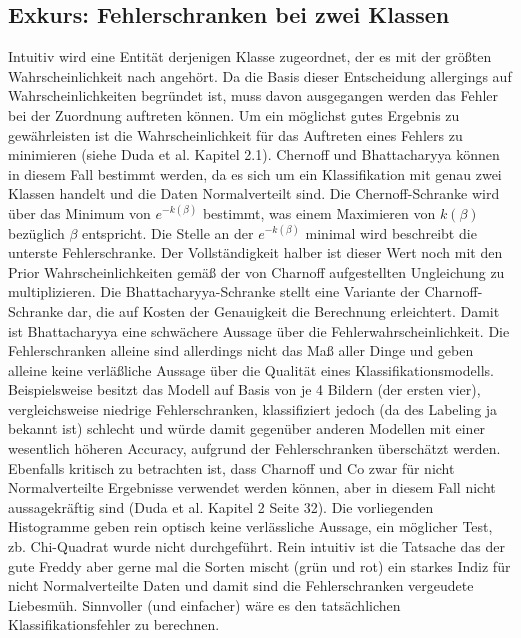 \documentclass[a4paper,10pt]{article}
\begin{document}
\subsection{Exkurs: Fehlerschranken bei zwei Klassen}
Intuitiv wird eine Entität derjenigen Klasse zugeordnet, der es mit der größten Wahrscheinlichkeit nach angehört. Da die Basis dieser Entscheidung allergings
auf Wahrscheinlichkeiten begründet ist, muss davon ausgegangen werden das Fehler bei der Zuordnung auftreten können. Um ein möglichst gutes Ergebnis zu gewährleisten
ist die Wahrscheinlichkeit für das Auftreten eines Fehlers zu minimieren (siehe Duda et al. Kapitel 2.1).
\newline
Chernoff und Bhattacharyya können in diesem Fall bestimmt werden, da es sich um ein Klassifikation mit genau zwei Klassen handelt und die Daten Normalverteilt sind.
Die Chernoff-Schranke wird über das Minimum von $e^{-k(\beta)}$ bestimmt, was einem Maximieren von $k(\beta)$ bezüglich $\beta$ entspricht. Die Stelle an
der $e^{-k(\beta)}$ minimal wird beschreibt die unterste Fehlerschranke. Der Vollständigkeit halber ist dieser Wert noch mit den Prior Wahrscheinlichkeiten
gemäß der von Charnoff aufgestellten Ungleichung zu multiplizieren.
\newline
Die Bhattacharyya-Schranke stellt eine Variante der Charnoff-Schranke dar, die auf Kosten der Genauigkeit die Berechnung erleichtert. Damit ist Bhattacharyya eine
schwächere Aussage über die Fehlerwahrscheinlichkeit.
\newline 
Die Fehlerschranken alleine sind allerdings nicht das Maß aller Dinge und geben alleine keine verläßliche Aussage über die Qualität eines Klassifikationsmodells.
Beispielsweise besitzt das Modell auf Basis von je 4 Bildern (der ersten vier), vergleichsweise niedrige Fehlerschranken, klassifiziert jedoch (da des Labeling ja
bekannt ist) schlecht und würde damit gegenüber anderen Modellen mit einer wesentlich höheren Accuracy, aufgrund der Fehlerschranken überschätzt werden.
\newline
Ebenfalls kritisch zu betrachten ist, dass Charnoff und Co zwar für nicht Normalverteilte Ergebnisse verwendet werden können, aber in diesem Fall nicht aussagekräftig sind
(Duda et al. Kapitel 2 Seite 32). Die vorliegenden Histogramme geben rein optisch keine verlässliche Aussage, ein möglicher Test, zb. Chi-Quadrat wurde nicht durchgeführt.
Rein intuitiv ist die Tatsache das der gute Freddy aber gerne mal die Sorten mischt (grün und rot) ein starkes Indiz für nicht Normalverteilte Daten und damit sind die Fehlerschranken
vergeudete Liebesmüh. Sinnvoller (und einfacher) wäre es den tatsächlichen Klassifikationsfehler zu berechnen.
\end{document}

